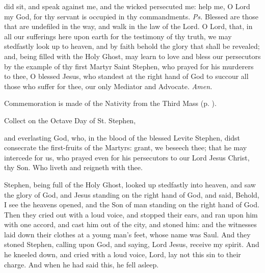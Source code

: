 \properantiphonfix

\introit
{} did sit, and speak against me, and the wicked persecuted me: help me, O Lord my God, for thy servant is occupied in thy commandments. \textit{Ps.} Blessed are those that are undefiled in the way, and walk in the law of the Lord.
\collect
{} O Lord, that, in all our sufferings here upon earth for the testimony of thy truth, we may stedfastly look up to heaven, and by faith behold the glory that shall be revealed; and, being filled with the Holy Ghost, may learn to love and bless our persecutors by the example of thy first Martyr Saint Stephen, who prayed for his murderers to thee, O blessed Jesus, who standest at the right hand of God to succour all those who suffer for thee, our only Mediator and Advocate. \textit{Amen.}
\begin{rubric}
    Commemoration is made of the Nativity from the Third Mass (p. \pageref{NativityMassIIICollect}).
\end{rubric}

\begin{rubric}
    Collect on the Octave Day of St. Stephen,
\end{rubric}
 and everlasting God, who, in the blood of the blessed Levite Stephen, didst consecrate the first-fruits of the Martyrs: grant, we beseech thee; that he may intercede for us, who prayed even for his persecutors to our Lord Jesus Christ, thy Son. Who liveth and reigneth with thee.

 Stephen, being full of the Holy Ghost, looked up stedfastly into heaven, and saw the glory of God, and Jesus standing on the right hand of God, and said, Behold, I see the heavens opened, and the Son of man standing on the right hand of God. Then they cried out with a loud voice, and stopped their ears, and ran upon him with one accord, and cast him out of the city, and stoned him: and the witnesses laid down their clothes at a young man’s feet, whose name was Saul. And they stoned Stephen, calling upon God, and saying, Lord Jesus, receive my spirit. And he kneeled down, and cried with a loud voice, Lord, lay not this sin to their charge. And when he had said this, he fell asleep.


